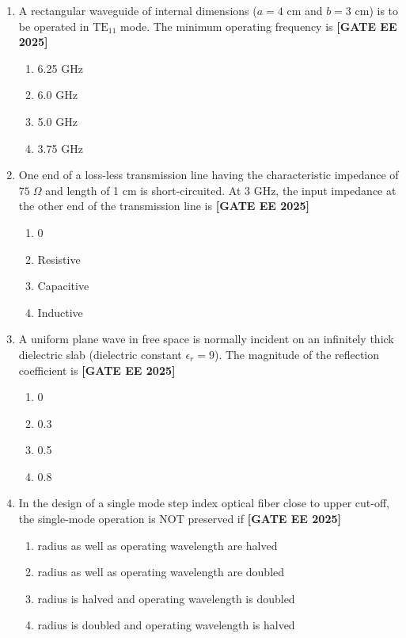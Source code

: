 \documentclass[12pt,a4paper]{article}
\begin{document}
\begin{enumerate}[leftmargin=*, label=\textbf{Q.\arabic*:}]
\item A rectangular waveguide of internal dimensions ($a=4$ cm and $b=3$ cm) is to be operated in $\mathrm{TE}_{11}$ mode. The minimum operating frequency is
\newline
\noindent \textbf{[GATE EE 2025]}
\begin{enumerate}[label=(\Alph*)]
  \item 6.25 GHz
  \item 6.0 GHz
  \item 5.0 GHz
  \item 3.75 GHz
\end{enumerate}

\item One end of a loss-less transmission line having the characteristic impedance of $75\;\Omega$ and length of 1 cm is short-circuited. At 3 GHz, the input impedance at the other end of the transmission line is
\newline
\noindent \textbf{[GATE EE 2025]}
\begin{enumerate}[label=(\Alph*)]
  \item 0
  \item Resistive
  \item Capacitive
  \item Inductive
\end{enumerate}

\item A uniform plane wave in free space is normally incident on an infinitely thick dielectric slab (dielectric constant $\epsilon_r = 9$). The magnitude of the reflection coefficient is
\newline
\noindent \textbf{[GATE EE 2025]}
\begin{enumerate}[label=(\Alph*)]
  \item 0
  \item 0.3
  \item 0.5
  \item 0.8
\end{enumerate}

\item In the design of a single mode step index optical fiber close to upper cut-off, the single-mode operation is NOT preserved if
\newline
\noindent \textbf{[GATE EE 2025]}
\begin{enumerate}[label=(\Alph*)]
  \item radius as well as operating wavelength are halved
  \item radius as well as operating wavelength are doubled
  \item radius is halved and operating wavelength is doubled
  \item radius is doubled and operating wavelength is halved
\end{enumerate}


\end{enumerate}
\end{document}
